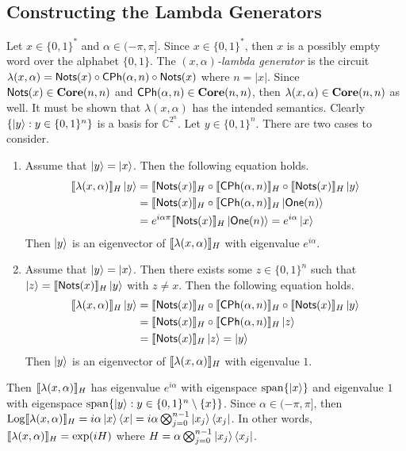 \subsection{Constructing the Lambda Generators}

Let $x \in \{ 0, 1 \}^*$ and $\alpha \in (-\pi, \pi]$.
Since $x \in \{ 0, 1 \}^*$, then $x$ is a possibly empty word over the alphabet $\{ 0, 1 \}$.
The \emph{$(x, \alpha)$-lambda generator} is the circuit $\lambda( x, \alpha ) = \mathsf{Nots}( x ) \circ \mathsf{CPh}( \alpha, n ) \circ \mathsf{Nots}( x )$ where $n = |x|$.
Since $\mathsf{Nots}( x ) \in \mathbf{Core}( n, n )$ and $\mathsf{CPh}( \alpha, n ) \in \mathbf{Core}( n, n )$, then $\lambda( x, \alpha ) \in \mathbf{Core}( n, n )$ as well.
It must be shown that $\lambda( x, \alpha )$ has the intended semantics.
Clearly $\{ \ket{y} : y \in \{ 0, 1 \}^n \}$ is a basis for $\mathbb{C}^{2^n}$.
Let $y \in \{ 0, 1 \}^n$.
There are two cases to consider.
\begin{enumerate}
\item Assume that $\ket{y} = \ket{x}$.
      Then the following equation holds.
      \begin{align*}
          \llbracket\lambda( x, \alpha )\rrbracket_H \ket{y}
          &=
          \llbracket\mathsf{Nots}( x )\rrbracket_H \circ \llbracket\mathsf{CPh}( \alpha, n )\rrbracket_H \circ \llbracket\mathsf{Nots}( x )\rrbracket_H \ket{y}
          \\
          &=
          \llbracket\mathsf{Nots}( x )\rrbracket_H \circ \llbracket\mathsf{CPh}( \alpha, n )\rrbracket_H \ket{\mathsf{One}( n )}
          \\
          &=
          e^{i\alpha\pi} \llbracket\mathsf{Nots}( x )\rrbracket_H \ket{\mathsf{One}( n )}
          =
          e^{i\alpha} \ket{x}
      \end{align*}
      Then $\ket{y}$ is an eigenvector of $\llbracket\lambda( x, \alpha)\rrbracket_H$ with eigenvalue $e^{i\alpha}$.
\item Assume that $\ket{y} = \ket{x}$.
      Then there exists some $z \in \{ 0, 1 \}^n$ such that $\ket{z} = \llbracket\mathsf{Nots}( x )\rrbracket_H \ket{y}$ with $z \ne x$.
      Then the following equation holds.
      \begin{align*}
          \llbracket\lambda( x, \alpha )\rrbracket_H \ket{y}
          &=
          \llbracket\mathsf{Nots}( x )\rrbracket_H \circ \llbracket\mathsf{CPh}( \alpha, n )\rrbracket_H \circ \llbracket\mathsf{Nots}( x )\rrbracket_H \ket{y}
          \\
          &=
          \llbracket\mathsf{Nots}( x )\rrbracket_H \circ \llbracket\mathsf{CPh}( \alpha, n )\rrbracket_H \ket{z}
          \\
          &=
          \llbracket\mathsf{Nots}( x )\rrbracket_H \ket{z}
          =
          \ket{y}
      \end{align*}
      Then $\ket{y}$ is an eigenvector of $\llbracket\lambda( x, \alpha)\rrbracket_H$ with eigenvalue $1$.
\end{enumerate}
Then $\llbracket\lambda( x, \alpha )\rrbracket_H$ has eigenvalue $e^{i\alpha}$ with eigenspace $\operatorname{span}\{ \ket{x} \}$ and eigenvalue $1$ with eigenspace $\operatorname{span}\{ \ket{y} : y \in \{ 0, 1 \}^n \setminus \{ x \} \}$.
Since $\alpha \in (-\pi, \pi]$, then $\operatorname{Log}\llbracket\lambda( x, \alpha )\rrbracket_H = i \alpha \ket{x} \bra{x} = i \alpha \bigotimes_{j=0}^{n-1} \ket{x_j} \bra{x_j}$.
In other words, $\llbracket\lambda( x, \alpha )\rrbracket_H = \exp( iH )$ where $H = \alpha \bigotimes_{j=0}^{n-1} \ket{x_j} \bra{x_j}$.

